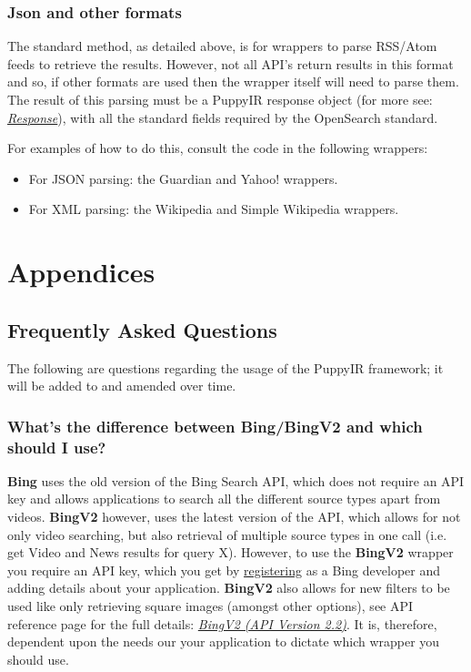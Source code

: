 \documentclass[letterpaper,10pt,english]{sphinxmanual}
\begin{document}
\subsection{Json and other formats}
\label{extendingSearchEngine:json-and-other-formats}
The standard method, as detailed above, is for wrappers to parse RSS/Atom feeds to retrieve the results. However, not all API's return results in this format and so, if other formats are used then the wrapper itself will need to parse them. The result of this parsing must be a PuppyIR response object (for more see: {\hyperref[api3.0:puppy-response]{\emph{Response}}}), with all the standard fields required by the OpenSearch standard.

For examples of how to do this, consult the code in the following wrappers:
\begin{itemize}
\item {} 
For JSON parsing: the Guardian and Yahoo! wrappers.

\item {} 
For XML parsing: the Wikipedia and Simple Wikipedia wrappers.

\end{itemize}


\chapter{Appendices}
\label{index:appendices}

\section{Frequently Asked Questions}
\label{faq:faq}\label{faq::doc}\label{faq:frequently-asked-questions}
The following are questions regarding the usage of the PuppyIR framework; it will be added to and amended over time.


\subsection{What's the difference between Bing/BingV2 and which should I use?}
\label{faq:what-s-the-difference-between-bing-bingv2-and-which-should-i-use}
\textbf{Bing} uses the old version of the Bing Search API, which does not require an API key and allows applications to search all the different source types apart from videos. \textbf{BingV2} however, uses the latest version of the API, which allows for not only video searching, but also retrieval of multiple source types in one call (i.e. get Video and News results for query X). However, to use the \textbf{BingV2} wrapper you require an API key, which you get by \href{http://www.bing.com/toolbox/bingdeveloper/}{registering} as a Bing developer and adding details about your application. \textbf{BingV2} also allows for new filters to be used like only retrieving square images (amongst other options), see API reference page for the full details: {\hyperref[api3.0:puppy-bingv2]{\emph{BingV2 (API Version 2.2)}}}. It is, therefore, dependent upon the needs our your application to dictate which wrapper you should use.
\end{document}
